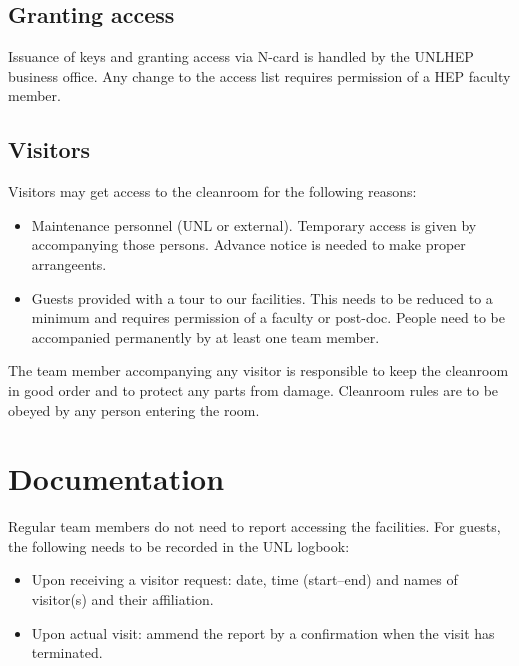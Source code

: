 \documentclass[12pt]{unlsilabsop}
\begin{document}
\subsection{Granting access}
Issuance of keys and granting access via N-card is handled by the UNLHEP business office. Any change to the access list requires permission of a HEP faculty member.


\subsection{Visitors}
Visitors may get access to the cleanroom for the following reasons:
\begin{itemize}
    \item Maintenance personnel (UNL or external). Temporary access is given by accompanying those persons. Advance notice is needed to make proper arrangeents.
    \item Guests provided with a tour to our facilities. This needs to be reduced to a minimum and requires permission of a faculty or post-doc. People need to be accompanied permanently by at least one team member.
\end{itemize}
The team member accompanying any visitor is responsible to keep the cleanroom in good order and to protect any parts from damage. Cleanroom rules are to be obeyed by any person entering the room.


\section{Documentation}
Regular team members do not need to report accessing the facilities. For guests, the following needs to be recorded in the UNL logbook:
\begin{itemize}
    \item Upon receiving a visitor request: date, time (start--end) and names of visitor(s) and their affiliation.
    \item Upon actual visit: ammend the report by a confirmation when the visit has terminated.
\end{itemize}
\end{document}
